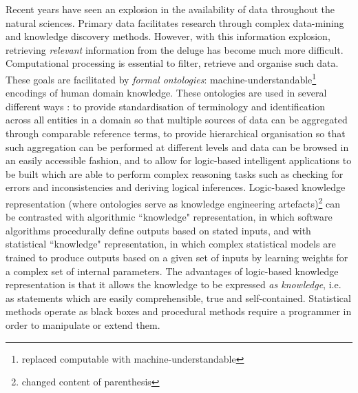 \documentclass[10pt]{bmc_article}
\newenvironment{bmcformat}{\baselineskip20pt\sloppy\setboolean{publ}{false}}{\baselineskip20pt\sloppy}
\begin{document}
\begin{bmcformat}
Recent years have seen an explosion in the availability of data throughout the natural sciences. Primary data facilitates research through complex data-mining and knowledge discovery methods. However, with this information explosion, retrieving \textit{relevant} information from the deluge has become much more difficult. Computational processing is essential to filter, retrieve and organise such data. These goals are facilitated by \textit{formal ontologies}: machine-understandable\footnote{replaced computable with machine-understandable} encodings of human domain knowledge. These ontologies are used in several different ways \cite{lambrix2004}: to provide standardisation of terminology and identification across all entities in a domain so that multiple sources of data can be aggregated through comparable reference terms, to provide hierarchical organisation so that such aggregation can be performed at different levels and data can be browsed in an easily accessible fashion, and to allow for logic-based intelligent applications to be built which are able to perform complex reasoning tasks such as checking for errors and inconsistencies and deriving logical inferences. Logic-based knowledge representation (where ontologies serve as knowledge engineering artefacts)\footnote{changed content of parenthesis} can be contrasted with algorithmic ``knowledge" representation, in which software algorithms procedurally define outputs based on stated inputs, and with statistical ``knowledge" representation, in which complex statistical models are trained to produce outputs based on a given set of inputs by learning weights for a complex set of internal parameters.  The advantages of logic-based knowledge representation is that it allows the knowledge to be expressed \textit{as knowledge}, i.e. as statements which are easily comprehensible, true and self-contained.  Statistical methods operate as black boxes and procedural methods require a programmer in order to manipulate or extend them. 


\end{bmcformat}
\end{document}
